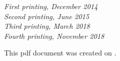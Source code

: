 \documentclass[11pt,fleqn]{book} %
\begin{document}
\noindent \textit{First printing, December 2014} \\  %
\noindent \textit{Second printing, June 2015}    \\  %
\noindent \textit{Third printing, March 2018}    \\  %
\noindent \textit{Fourth printing, November 2018} %

\noindent This pdf document was created on \textit{\pdfcreationdate}.



\pagestyle{empty} %


\tableofcontents %
\listoftables
\listoffigures
\lstlistoflistings

\cleardoublepage %

\pagestyle{fancy} %


\mainmatter


\backmatter


\end{document}

